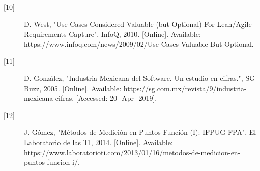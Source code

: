 \begin{description}
		\item[\hypertarget{b10}{[10]}] D. West, "Use Cases Considered Valuable (but Optional) For Lean/Agile Requirements Capture", InfoQ, 2010. [Online]. Available: https://www.infoq.com/news/2009/02/Use-Cases-Valuable-But-Optional. 
		
		\item[\hypertarget{b11}{[11]}] D. González, "Industria Mexicana del Software. Un estudio en cifras.", SG Buzz, 2005. [Online]. Available: https://sg.com.mx/revista/9/industria-mexicana-cifras. [Accessed: 20- Apr- 2019].
		
		\item[\hypertarget{b12}{[12]}] J. Gómez, "Métodos de Medición en Puntos Función (I): IFPUG FPA", El Laboratorio de las TI, 2014. [Online]. Available: https://www.laboratorioti.com/2013/01/16/metodos-de-medicion-en-puntos-funcion-i/. 
\end{description}